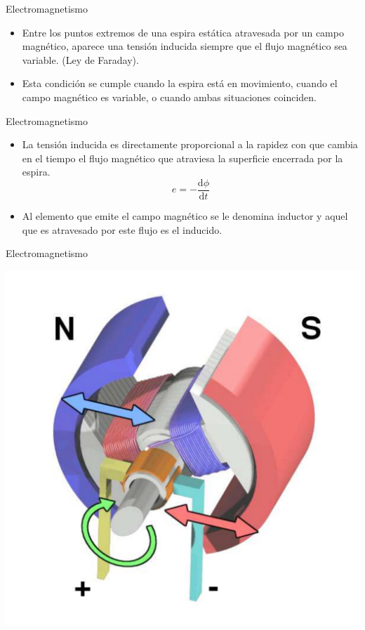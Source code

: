 \documentclass[xcolor={usenames,svgnames,dvipsnames}]{beamer}
\begin{document}
\begin{frame}[label={sec:org1b49253}]{Electromagnetismo}
\begin{itemize}
\item Entre los puntos extremos de una espira estática atravesada por un
campo magnético, aparece una \alert{tensión inducida siempre que el flujo
magnético sea variable}. (Ley de Faraday).

\item Esta condición se cumple cuando la \alert{espira está en movimiento,}
cuando el \alert{campo magnético es variable}, o cuando ambas situaciones
coinciden.
\end{itemize}
\end{frame}

\begin{frame}[label={sec:org672ca30}]{Electromagnetismo}
\begin{itemize}
\item La tensión inducida es directamente proporcional a la rapidez con que
cambia en el tiempo el flujo magnético que atraviesa la superficie
encerrada por la espira. $$e=-\frac{\mathrm{d}\phi}{\mathrm{d}t}$$

\item Al elemento que emite el campo magnético se le denomina \alert{inductor} y
aquel que es atravesado por este flujo es el \alert{inducido}.
\end{itemize}
\end{frame}

\begin{frame}[label={sec:orgfaada0f}]{Electromagnetismo}
\begin{center}
\includegraphics[width=.9\linewidth]{../figs/Electric_motor_cycle_3.pdf}
\end{center}
\end{frame}
\end{document}

